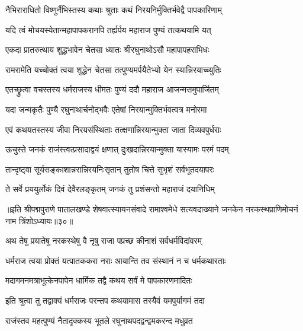 
\twolineshloka
{नैभिराराधितो विष्णुर्नैभिस्तस्य कथाः श्रुताः}
{कथं निरयनिर्मुक्तिर्भवेद्वै पापकारिणाम्}%

\twolineshloka
{यदि त्वं मोचयस्येतान्महापापकरानपि}
{तर्ह्यर्पय महाराज पुण्यं तत्कथयामि यत्}%

\twolineshloka
{एकदा प्रातरुत्थाय शुद्धभावेन चेतसा}
{ध्यातः श्रीरघुनाथोऽसौ महापापहराभिधः}%

\twolineshloka
{रामरामेति यच्चोक्तं त्वया शुद्धेन चेतसा}
{तत्पुण्यमर्पयैतेभ्यो येन स्यान्निरयाच्च्युतिः}%


\twolineshloka
{एतच्छ्रुत्वा वचस्तस्य धर्मराजस्य धीमतः}
{पुण्यं ददौ महाराज आजन्मसमुपार्जितम्}%

\twolineshloka
{यदा जन्मकृतैः पुण्यै रघुनाथार्चनोद्भवैः}
{एतेषां निरयान्मुक्तिर्भवत्वत्र मनोरमा}%

\twolineshloka
{एवं कथयतस्तस्य जीवा निरयसंस्थिताः}
{तत्क्षणान्निरयान्मुक्ता जाता दिव्यवपुर्धराः}%

\twolineshloka
{ऊचुस्ते जनकं राजंस्त्वत्प्रसादाद्वयं क्षणात्}
{दुःखदान्निरयान्मुक्ता यास्यामः परमं पदम्}%

\twolineshloka
{तान्दृष्ट्वा सूर्यसङ्काशान्नरान्निरयनिःसृतान्}
{तुतोष चित्ते सुभृशं सर्वभूतदयापरः}%

\twolineshloka
{ते सर्वे प्रययुर्लोकं दिवं देवैरलङ्कृतम्}
{जनकं तु प्रशंसन्तो महाराजं दयानिधिम्}%

{॥इति श्रीपद्मपुराणे पातालखण्डे शेषवात्स्यायनसंवादे रामाश्वमेधे सत्यवदाख्याने जनकेन नरकस्थप्राणिमोचनं नाम त्रिंशोऽध्यायः॥३०॥}



\twolineshloka
{अथ तेषु प्रयातेषु नरकस्थेषु वै नृषु}
{राजा पप्रच्छ कीनाशं सर्वधर्मविदांवरम्}%


\twolineshloka
{धर्मराज त्वया प्रोक्तं यत्पातककरा नराः}
{आयान्ति तव संस्थानं न च धर्मकथारताः}%

\twolineshloka
{मदागमनमत्राभूत्केनपापेन धार्मिक}
{तद्वै कथय सर्वं मे पापकारणमादितः}%

\twolineshloka
{इति श्रुत्वा तु तद्वाक्यं धर्मराजः परन्तप}
{कथयामास तस्यैवं यमपुर्यागमं तदा}%


\twolineshloka
{राजंस्तव महत्पुण्यं नैतादृक्कस्य भूतले}
{रघुनाथपदद्वन्द्वमकरन्द मधुव्रत}%

